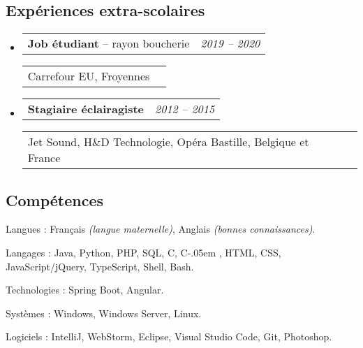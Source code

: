 \documentclass[10pt,a4paper]{article}
\makeatletter
\newcommand{\Csharp}{%
  {\settoheight{\dimen0}{C}C\kern-.05em \resizebox{!}{\dimen0}{\raisebox{\depth}{\#}}}}
\newenvironment{indentsection}[1]
{\begin{list}{}
  {\setlength{\leftmargin}{#1}} \item[]
}
{\end{list}}
\newcommand{\headerrow}[2]
{\begin{tabular*}{\linewidth}{l@{\extracolsep{\fill}}r}
  #1 &
  #2 \\
\end{tabular*}}
\makeatother
\begin{document}
\subsection*{Expériences extra-scolaires}
\begin{itemize}
  \parskip=0.1em

  \item
  \headerrow
    {\textbf{Job étudiant} -- rayon boucherie}
    {\emph{2019 -- 2020}}
  \headerrow
    {{Carrefour EU, Froyennes}}
    {\emph{}}
  \item
  \headerrow
    {\textbf{Stagiaire éclairagiste}}
    {\emph{2012 -- 2015}}
  \headerrow
    {{Jet Sound, H\&D Technologie, Opéra Bastille, Belgique et France}}
    {\emph{}}
\end{itemize}


\vspace{-0.4em}
\subsection*{Compétences}
\begin{indentsection}{\parindent}
\begin{description*}
  \item[Langues :]
  Français \emph{(langue maternelle)}, %
  Anglais \emph{(bonnes connaissances)}.
  \item[Langages :] Java, Python, PHP, SQL, C, \Csharp, HTML,
  CSS, JavaScript/jQuery, TypeScript, Shell, Bash.
  \item[Technologies :] Spring Boot, Angular.
  \item[Systèmes :] Windows, Windows Server, Linux.
  \item[Logiciels :] IntelliJ, WebStorm, Eclipse, Visual Studio Code, Git,
  Photoshop.
\end{description*}
\end{indentsection}
\end{document}
